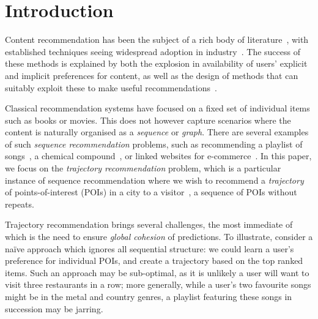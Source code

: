 
\section{Introduction}
\label{sec:intro}

Content recommendation has been the subject of a rich body of literature~\citep{Goldberg:1992,Sarwar:2001,Koren:2010},
with established techniques seeing widespread adoption in industry~\citep{Linden:2003,Agarwal:2013,Amatriain:2015,Gomez-Uribe:2015}.
The success of these methods is explained by both the explosion in availability of users' explicit and implicit preferences for content,
as well as the design of methods that can suitably exploit these to make useful recommendations~\citep{Koren:2009}.

Classical recommendation systems have focused on a fixed set of individual items such as books or movies.
This does not however capture scenarios where
the content %
is
naturally organised as a \emph{sequence} or {\em graph}.
There are several examples of such \emph{sequence recommendation} problems, such as
recommending
a playlist of songs~\citep{McFee:2011,chen2012playlist,hidasi2015session,choi2016towards},
a chemical compound~\cite{dehaspe1998finding},
or linked websites for e-commerce~\cite{antikacioglu2015recommendation}.
In this paper, we focus on the \emph{trajectory recommendation} problem,
which is a particular instance of sequence recommendation
where we wish to
recommend a \emph{trajectory} of points-of-interest (POIs) in a city to a visitor~\citep{lu2010photo2trip,lu2012personalized,ijcai15,cikm16paper},
\ie a sequence of POIs without repeats.



Trajectory recommendation brings several challenges,
the most immediate of which is the need to ensure \emph{global cohesion} of predictions.
To illustrate, consider a na\"{i}ve approach
which ignores all sequential structure:
we could learn a user's preference for individual POIs,
and create a trajectory based on the top ranked items.
Such an approach may be sub-optimal,
as
it is unlikely \eg a user will want to visit three restaurants in a row;
more generally,
while a user's two favourite songs might be in
the metal and country genres,
a playlist featuring these songs in succession may be jarring.

